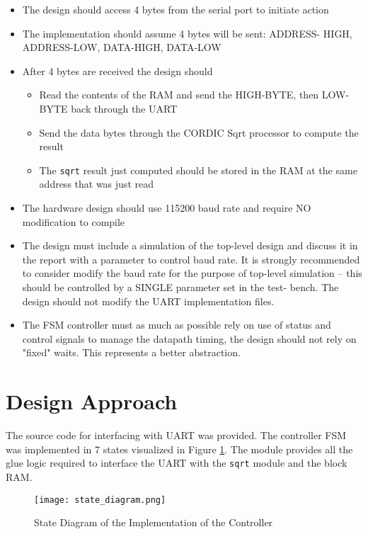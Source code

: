 \documentclass[paper=usletter, fontsize=12pt]{article}
\begin{document}
        \begin{itemize}

        \item The design should access 4 bytes from the serial port to initiate
        action

        \item The implementation should assume 4 bytes will be sent: ADDRESS-
        HIGH, ADDRESS-LOW, DATA-HIGH, DATA-LOW

        \item After 4 bytes are received the design should

        \begin{itemize}

            \item Read the contents of the RAM and send the HIGH-BYTE, then
            LOW-BYTE back through the UART

            \item Send the data bytes through the CORDIC Sqrt processor to
            compute the result

            \item The \texttt{sqrt} result just computed should be stored in
            the RAM at the same address that was just read

        \end{itemize}

        \item The hardware design should use 115200 baud rate and require NO
        modification to compile

        \item The design must include a simulation of the top-level design and
        discuss it in the report with a parameter to control baud rate. It is
        strongly recommended to consider modify the baud rate for the purpose
        of top-level simulation -- this should be controlled by a SINGLE
        parameter set in the test- bench. The design should not modify the UART
        implementation files.

        \item The FSM controller must as much as possible rely on use of status
        and control signals to manage the datapath timing, the design should
        not rely on "fixed" waits. This represents a better abstraction.

        \end{itemize}

    \section{Design Approach} The source code for interfacing with UART was
    provided. The controller FSM was implemented in 7 states visualized in
    Figure \ref{fig:states}. The module provides all the glue logic required to
    interface the UART with the \texttt{sqrt} module and the block RAM.

    \begin{figure}[ht]
        \begin{center}
            \texttt{[image: state\_diagram.png]}
            \caption{State Diagram of the Implementation of the Controller}
            \label{fig:states}
        \end{center}
    \end{figure}
\end{document}
